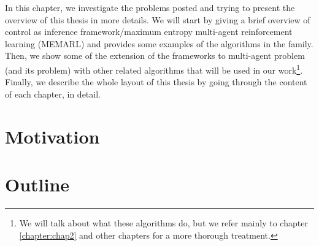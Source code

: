 \label{chapter:intro}
\begin{miniabstract}
    In this chapter, we investigate the problems posted and trying to present the overview of this thesis in more details. We will start by giving a brief overview of control as inference framework/maximum entropy multi-agent reinforcement learning (MEMARL) and provides some examples of the algorithms in the family. Then, we show some of the extension of the frameworks to multi-agent problem (and its problem) with other related algorithms that will be used in our work\footnote{We will talk about what these algorithms do, but we refer mainly to chapter \ref{chapter:chap2} and other chapters for a more thorough treatment.}. Finally, we describe the whole layout of this thesis by going through the content of each chapter, in detail.  
\end{miniabstract}

\section{Motivation}


\section{Outline}
